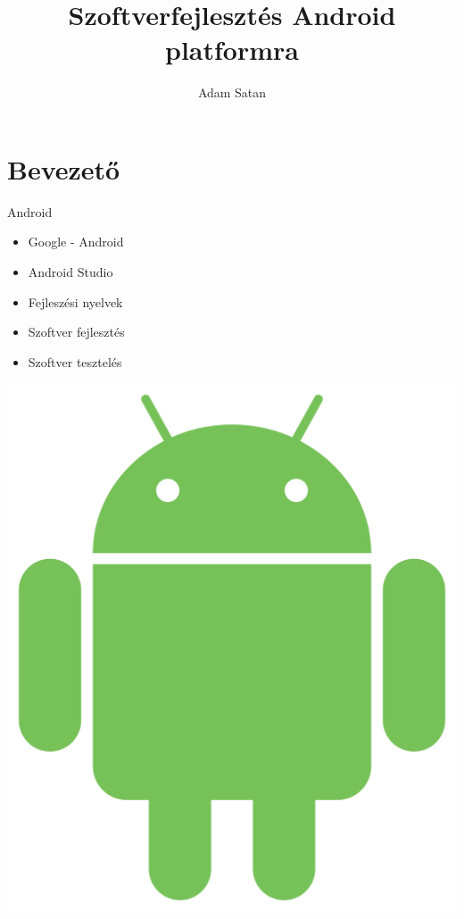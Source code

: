 \documentclass{beamer}
\title[Android Fejlesztés]{Szoftverfejlesztés Android platformra}
\author{Adam Satan}
\institute{Minőségbiztosítás informatikája}
\date{\the\year}
\begin{document}
\maketitle

\section{Bevezető}

\begin{frame}[fragile]{Android}
	\begin{minipage}{0.49\textwidth}		
		\begin{itemize}
			\item Google - Android
			\item Android Studio
			\item Fejleszési nyelvek
			\item Szoftver fejlesztés
			\item Szoftver tesztelés	
		\end{itemize}
	\end{minipage}
\begin{minipage}{0.49\textwidth}
\includegraphics[width=1 \linewidth]{figures/android.png}
\end{minipage}
\end{frame}
\end{document}
